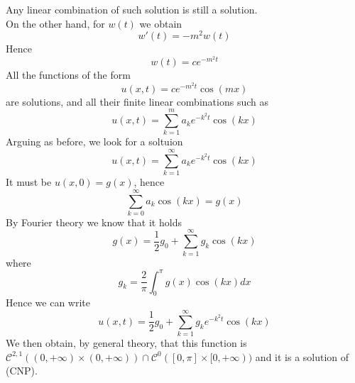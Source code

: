 \begin{enumerate}
        Any linear combination of such solution is still a solution.\\
        On the other hand, for $w(t)$ we obtain
        \begin{equation*}
            w'(t) = -m^2 w(t)
        \end{equation*}
        Hence
        \begin{equation*}
            w(t) = c e^{-m^2 t}
        \end{equation*}
        All the functions of the form
        \begin{equation*}
            u(x,t)=ce^{-m^2 t} \cos (m x)
        \end{equation*}
        are solutions, and all their finite linear combinations such as 
        \begin{equation*}
            u(x,t) = \sum_{k=1}^m a_k e^{-k^2 t} \cos (k x)
        \end{equation*}
        Arguing as before, we look for a soltuion
        \begin{equation*}
            u(x,t)=\sum_{k=1}^\infty a_k e^{-k^2 t} \cos (kx)
        \end{equation*}
        It must be $u(x,0)=g(x)$, hence
        \begin{equation*}
            \sum_{k=0}^\infty a_k \cos(kx) = g(x)
        \end{equation*}
        By Fourier theory we know that it holds
        \begin{equation*}
            g(x)=\frac{1}{2} g_0 + \sum_{k=1}^\infty g_k \cos(kx)
        \end{equation*}
        where
        \begin{equation*}
            g_k = \frac{2}{\pi} \int_0^\pi g(x) \cos(kx) dx
        \end{equation*}
        Hence we can write
        \begin{equation*}
            u(x,t)=\frac{1}{2}g_0 + \sum_{k=1}^\infty g_ke^{-k^2t} \cos (kx)
        \end{equation*}
        We then obtain, by general theory, that this function is $\mathcal{C}^{2,1}((0,+\infty) \times (0,+\infty)) \cap \mathcal{C}^0([0,\pi] \times [0,+\infty))$ and it is a solution of (CNP).
\end{enumerate}



